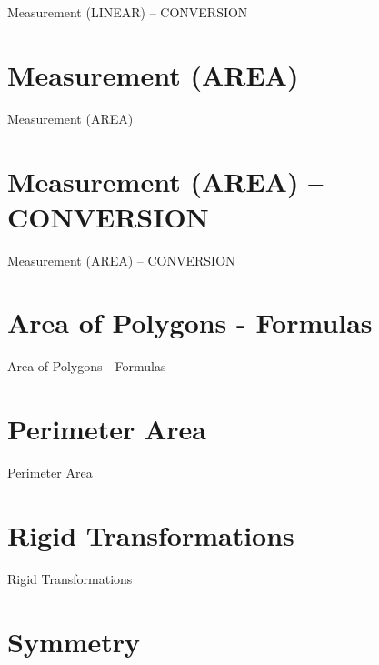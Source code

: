 Measurement (LINEAR) – CONVERSION

\section{Measurement (AREA)}
\label{sec:measurement-area}

Measurement (AREA)

\section{Measurement (AREA) – CONVERSION}
\label{sec:measurement-area-conversion}

Measurement (AREA) – CONVERSION

\section{Area of Polygons - Formulas}
\label{sec:area-of-polygons-formulas}

Area of Polygons - Formulas

\section{Perimeter Area}
\label{sec:perimeter-area}

Perimeter Area

\section{Rigid Transformations}
\label{sec:rigid-transformations}

Rigid Transformations

\section{Symmetry}
\label{sec:symmetry}

